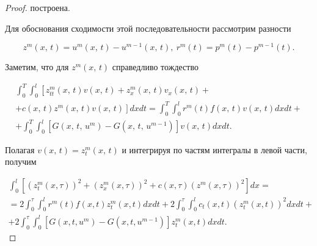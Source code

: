 \begin{proof}
построена.



Для обоснования сходимости этой последовательности рассмотрим разности

    \begin{equation*}

        z^m(x,\,t) = u^m (x,\,t)- u^{m-1}(x,\,t), \ r^m(t) = p^m(t) - p^{m-1}(t).

    \end{equation*}



Заметим, что  для $z^m(x,\,t)$ справедливо тождество

    \begin{multline*}


     \int _0^T\int _0^l \left[ z_{tt}^m(x,\,t)v(x,\,t)+z_x^m(x,\,t)v_x(x,\,t) + \right.\\

     \left.+ c(x,\,t)z^m(x,\,t)v(x,\,t)\right]

     dxdt

    =\int _0^T\int _0^l r^m(t)f(x,\,t)v(x,\,t)dxdt+\\

    +\int _0^T\int _0^l \left[ G(x,\,t,\,u^m)-G(x,\,t,\,u^{m-1})\right]  v(x,\,t)dxdt.

    \end{multline*}

Полагая $ v(x,\,t)=z^m_t(x,\,t)$ и интегрируя по частям интегралы в левой части, получим

    \begin{multline*}

    \int _0^l  \left[ \left( z^{m}_{t}(x,\tau)\right)^2+  \left( z^{m}_x(x,\tau)\right)^2 +c(x,\tau)\left( z^{m}(x,\tau)\right)^2\right]

    dx=\\


    =2\int _0^\tau\int _0^l r^m(t)f(x,t)z^{m}_{t}(x,t) dx dt +2\int _0^\tau\int _0^l c_t(x,t)\left(z^{m}_{t}(x,t)\right)^2 dx

    dt+\\

    +2\int _0^\tau\int _0^l \left[  G(x,t,u^m)-G(x,t,u^{m-1})\right] z^{m}_{t}(x,t) dx dt.

    \end{multline*}




\end{proof}
